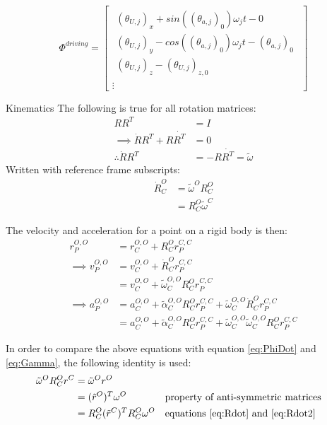 \begin{equation}
    \Phi^{driving}=
    \begin{bmatrix}
    \begin{array}{l} %
    (\theta_{U,j})_x + sin((\theta_{a,j})_0)\omega_j t - 0\\
    (\theta_{U,j})_y - cos((\theta_{a,j})_0)\omega_j t - (\theta_{a,j})_0 \\
    (\theta_{U,j})_z - (\theta_{U,j})_{z,0}
    \end{array}\\
    \vdots
    \end{bmatrix}
\end{equation}

Kinematics
The following is true for all rotation matrices:
\begin{align}
RR^T&=I \\
\implies \dot{R}R^T+R\dot{R^T}&=0 \nonumber\\
\therefore \dot{R}R^T&=-R\dot{R^T}=\tilde{\omega} \label{eq:omega}
\end{align}
Written with reference frame subscripts:
\begin{align}
       \dot{R}^O_C &=\tilde{\omega}^O R^O_C \label{eq:Rdot} \\
             &= R^O_C \tilde{\omega}^C \label{eq:Rdot2}
\end{align}

The velocity and acceleration for a point on a rigid body is then:
\begin{align}
r_P^{O,O}&=r_C^{O,O}+R^O_C r_P^{C,C} \\
\implies v_P^{O,O}&=v_C^{O,O}+\dot{R}^O_C r_P^{C,C} \nonumber\\
                 &=v_C^{O,O}+\tilde{\omega}^{O,O}_C R^O_C r_P^{C,C}  \\
\implies a_P^{O,O}&=a_C^{O,O}+\tilde{\alpha}^{O,O}_C R^O_C r_P^{C,C} + \tilde{\omega}^{O,O}_C \dot{R}^O_C r_P^{C,C} \nonumber \\
                  &=a_C^{O,O}+\tilde{\alpha}^{O,O}_C R^O_C r_P^{C,C} + \tilde{\omega}^{O,O}_C \tilde{\omega}^{O,O}_C R^O_C r_P^{C,C}
\end{align}

In order to compare the above equations with  equation \ref{eq:PhiDot} and \ref{eq:Gamma}, the following identity is used:
\begin{align*}
\tilde{\omega}^O R^O_C r^C &= \tilde{\omega}^O r^O \\
                           &= (\tilde{r}^O)^T \omega^O   &&\text{property of anti-symmetric matrices} \\
                           &= R^O_C (\tilde{r}^C)^T R_C^O \omega^O &&\text{equations \ref{eq:Rdot} and \ref{eq:Rdot2}}
\end{align*}


